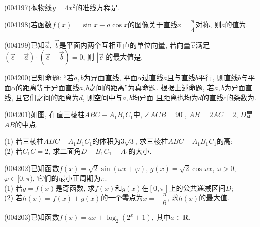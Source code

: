 \item (004197)抛物线$y=4x^2$的准线方程是.
\item (004198)若函数$f(x)=\sin x+a\cos x$的图像关于直线$x=\dfrac{\pi}4$对称, 则$a$的值为.
\item (004199)已知$\overrightarrow a$, $\overrightarrow b$是平面内两个互相垂直的单位向量, 若向量$\overrightarrow c$满足$(\overrightarrow c-\overrightarrow a)\cdot (\overrightarrow c-\overrightarrow b)=0$, 则
$|\overrightarrow c|$的最大值是.
\item (004200)已知命题: ``若$a,b$为异面直线, 平面$\alpha$过直线$a$且与直线$b$平行, 则直线$b$与平面$\alpha$的距离等于异面直线$a,b$之间的距离''为真命题.
根据上述命题, 若$a,b$为异面直线, 且它们之间的距离为$d$, 则空间中与$a,b$均异面
且距离也均为$d$的直线$c$的条数为.
\item (004201)如图, 在直三棱柱$ABC-A_1B_1C_1$中, $\angle ACB=90^\circ$,
$AB=2AC=2$, $D$是$AB$的中点.
\begin{center}
\end{center}
(1) 若三棱柱$ABC-A_1B_1C_1$的体积为$3\sqrt 3$, 求三棱柱$ABC-A_1B_1C_1$的高;\\
(2) 若$C_1C=2$, 求二面角$D-B_1C_1-A_1$的大小.
\item (004202)已知函数$f(x)=\sqrt 2\sin (\omega x+\varphi)$, $g(x)=\sqrt 2\cos \omega x$, $\omega >0$, $\varphi \in [0,\pi)$, 它们的最小正周期为$\pi$.\\
(1) 若$y=f(x)$是奇函数, 求$f(x)$和$g(x)$在$[0,\pi]$上的公共递减区间$D$;\\
(2) 若$h(x)=f(x)+g(x)$的一个零点为$x=-\dfrac{\pi}6$, 求$h(x)$的最大值.
\item (004203)已知函数$f(x)=ax+\log_2(2^x+1)$, 其中$a\in \mathbf{R}$.\\
